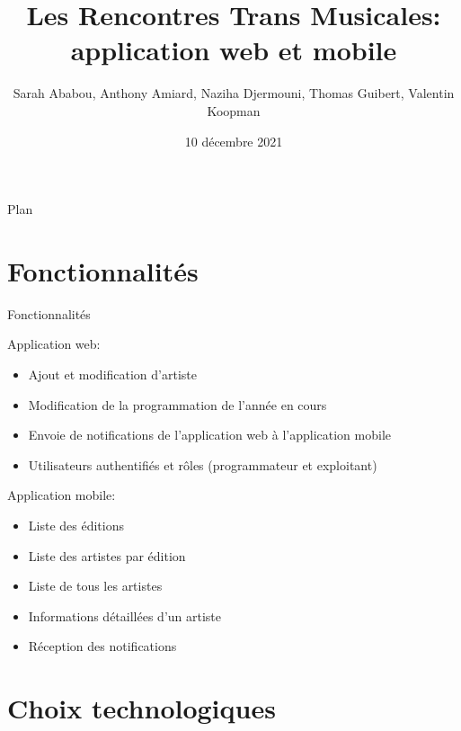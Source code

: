 \documentclass{beamer}
\begin{document}
\title{Les Rencontres Trans Musicales: application web et mobile}
\author{Sarah Ababou, Anthony Amiard, Naziha Djermouni, Thomas Guibert, Valentin
        Koopman}
\date{10 décembre 2021}

\begin{frame}

\titlepage

\end{frame}

\begin{frame}{Plan}

\tableofcontents

\end{frame}

\section{Fonctionnalités}

\begin{frame}{Fonctionnalités}

Application web:

\begin{itemize}
    \item Ajout et modification d'artiste
    \item Modification de la programmation de l'année en cours
    \item Envoie de notifications de l'application web à l'application mobile
    \item Utilisateurs authentifiés et rôles (programmateur et exploitant)
\end{itemize}

Application mobile:

\begin{itemize}
    \item Liste des éditions
    \item Liste des artistes par édition
    \item Liste de tous les artistes
    \item Informations détaillées d'un artiste
    \item Réception des notifications
\end{itemize}

\end{frame}

\section{Choix technologiques}
\end{document}

